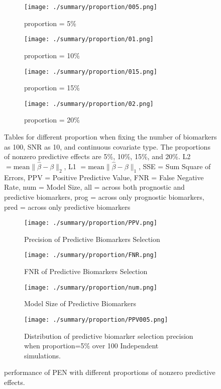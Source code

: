 \documentclass[12pt]{article}
\begin{document}
\begin{figure}[t] 
  \begin{subfigure}{0.9\textwidth}
    \texttt{[image: ./summary/proportion/005.png]}
  \caption{proportion = 5\%}
\end{subfigure}
\begin{subfigure}{0.9\textwidth}
  \texttt{[image: ./summary/proportion/01.png]}
  \caption{proportion = 10\%}
\end{subfigure}
\begin{subfigure}{0.9\textwidth}
  \texttt{[image: ./summary/proportion/015.png]}
  \caption{proportion = 15\%}
\end{subfigure}
\begin{subfigure}{0.9\textwidth}
  \texttt{[image: ./summary/proportion/02.png]}
  \caption{proportion = 20\%}
\end{subfigure}
  \centering
  \caption{Tables for different proportion when fixing the number of biomarkers as 100, 
  SNR as 10, and continuous covariate type. The proportions of nonzero predictive effects are 5\%,
   10\%, 15\%, and 20\%. L2 $=\text{mean}\parallel \hat{\beta}-\beta \parallel_2$, 
   L1 $=\text{mean}\parallel \hat{\beta}-\beta \parallel_1$, SSE = Sum Square of Errors, 
   PPV = Positive Predictive Value, FNR = False Negative Rate, num = Model Size, 
   all = across both prognostic and predictive biomarkers, prog = across only prognostic biomarkers,
   pred =  across only predictive biomarkers}
   \label{prop_table}
  \end{figure}
  
  \begin{figure}[t]
    \begin{subfigure}{0.45\textwidth}
      \texttt{[image: ./summary/proportion/PPV.png]}
    \caption{Precision of Predictive Biomarkers Selection}
  \end{subfigure}
  \begin{subfigure}{0.45\textwidth}
    \texttt{[image: ./summary/proportion/FNR.png]}
    \caption{FNR of Predictive Biomarkers Selection}
  \end{subfigure}
  \begin{subfigure}{0.45\textwidth}
    \texttt{[image: ./summary/proportion/num.png]}
    \caption{Model Size of Predictive Biomarkers}
  \end{subfigure}
  \begin{subfigure}{0.45\textwidth}
    \texttt{[image: ./summary/proportion/PPV005.png]}
    \caption{Distribution of predictive biomarker selection precision when proportion=5\% over 100 Independent simulations.}
  \end{subfigure}
    \centering
    \caption{performance of PEN with different proportions of nonzero predictive effects.
    }
  \label{prop_fig}
\end{figure}
\end{document}
